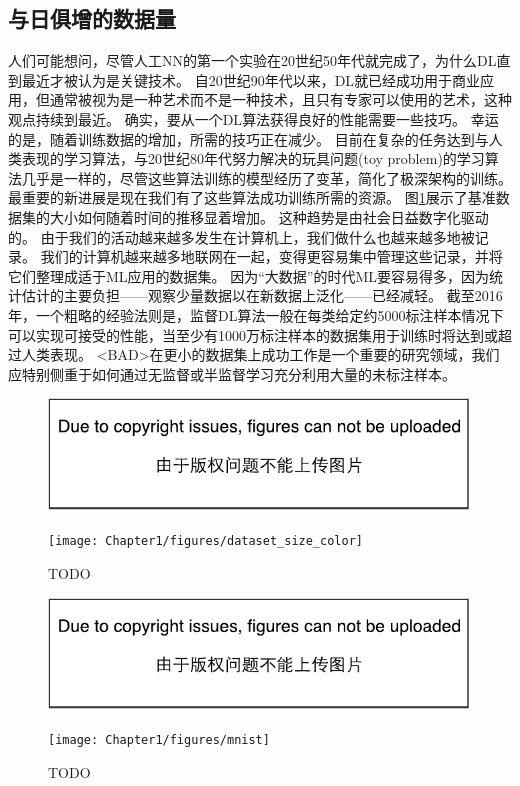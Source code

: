 \subsection{与日俱增的数据量}
\label{sec:increasing_dataset_sizes}
人们可能想问，尽管人工\gls{NN}的第一个实验在20世纪50年代就完成了，为什么\gls{DL}直到最近才被认为是关键技术。
自20世纪90年代以来，\gls{DL}就已经成功用于商业应用，但通常被视为是一种艺术而不是一种技术，且只有专家可以使用的艺术，这种观点持续到最近。
确实，要从一个\gls{DL}算法获得良好的性能需要一些技巧。
幸运的是，随着训练数据的增加，所需的技巧正在减少。
目前在复杂的任务达到与人类表现的学习算法，与20世纪80年代努力解决的玩具问题(toy problem)的学习算法几乎是一样的，尽管这些算法训练的模型经历了变革，简化了极深架构的训练。
最重要的新进展是现在我们有了这些算法成功训练所需的资源。
图\ref{fig:chap1_dataset_size_color}展示了基准数据集的大小如何随着时间的推移显着增加。
这种趋势是由社会日益数字化驱动的。
由于我们的活动越来越多发生在计算机上，我们做什么也越来越多地被记录。
我们的计算机越来越多地联网在一起，变得更容易集中管理这些记录，并将它们整理成适于\gls{ML}应用的数据集。
因为``大数据''的时代\gls{ML}要容易得多，因为统计估计的主要负担——观察少量数据以在新数据上泛化——已经减轻。
截至2016年，一个粗略的经验法则是，监督\gls{DL}算法一般在每类给定约5000标注样本情况下可以实现可接受的性能，当至少有1000万标注样本的数据集用于训练时将达到或超过人类表现。
<BAD>在更小的数据集上成功工作是一个重要的研究领域，我们应特别侧重于如何通过无监督或半监督学习充分利用大量的未标注样本。
\begin{figure}[!htb]
\ifOpenSource
\centerline{\includegraphics{figure.pdf}}
\else
\centerline{\texttt{[image: Chapter1/figures/dataset\_size\_color]}}
\fi
\caption{TODO}
\label{fig:chap1_dataset_size_color}
\end{figure}
\begin{figure}[!htb]
\ifOpenSource
\centerline{\includegraphics{figure.pdf}}
\else
\centerline{\texttt{[image: Chapter1/figures/mnist]}}
\fi
\caption{TODO}
\label{fig:chap1_mnist}
\end{figure}

